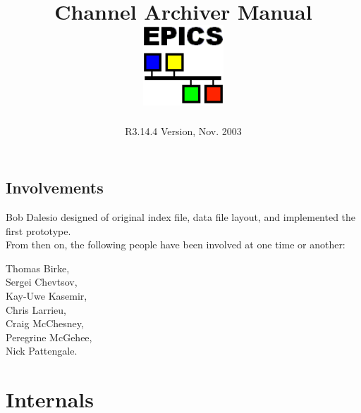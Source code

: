 \documentclass{report}
\begin{document}
\sffamily
\title{\Huge Channel Archiver Manual\\[1cm]
\includegraphics[width=3cm]{logo101}
}
\date{R3.14.4 Version, Nov. 2003}
\maketitle
\newpage

\pagestyle{empty}
\section*{Involvements}
Bob Dalesio designed of original index file, data file layout,
and implemented the first prototype.\\
From then on, the following people have been involved at one
time or another:\\
\begin{center}
Thomas Birke,\\
Sergei Chevtsov,\\
Kay-Uwe Kasemir,\\ 
Chris Larrieu,\\
Craig McChesney,\\
Peregrine McGehee,\\
Nick Pattengale.
\end{center}
\newpage

\tableofcontents
\newpage
\pagestyle{headings}
\setcounter{page}{1}








\chapter{Internals}

\clearpage









\printindex
\end{document}
